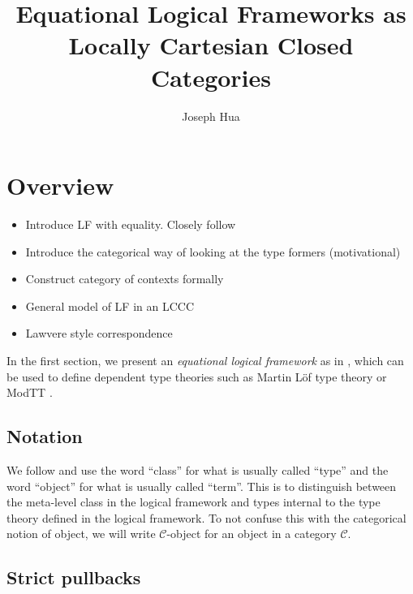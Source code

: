\documentclass{article}
\newcommand{\<}{\langle}
\renewcommand{\>}{\rangle}
\newcommand{\CC}{\mathcal{C}}
\newcommand{\link}[1]{\hypertarget{#1}{}}
\theoremstyle{definitionstyle}
\theoremstyle{exercisestyle}
\theoremstyle{remarkstyle}
\begin{document}
\title{Equational Logical Frameworks as Locally Cartesian Closed Categories}
\author{Joseph Hua}
\maketitle

\tableofcontents

\section{Overview}

\begin{itemize}
  \item Introduce LF with equality. Closely follow \cite{harper2021equational}
  \item Introduce the categorical way of looking at the type formers (motivational)
  \item Construct category of contexts formally
  \item General model of LF in an LCCC
  \item Lawvere style correspondence
\end{itemize}

In the first section, we present an \textit{equational logical framework} as in \cite{harper2021equational},
which can be used to define dependent type theories such as Martin L{\"o}f type theory or
\textsf{ModTT} \cite{Sterling_2021}.

\subsection{Notation}

We follow \cite{harper2021equational} and use the word ``class'' for what is usually called ``type'' and
the word ``object'' for what is usually called ``term''.
This is to distinguish between the meta-level class in the logical framework
and types internal to the type theory defined in the logical framework.
To not confuse this with the categorical notion of object,
we will write $\CC$-object for an object in a category $\CC$.









\subsection{Strict pullbacks}
\link{strict_pullbacks}
\end{document}
